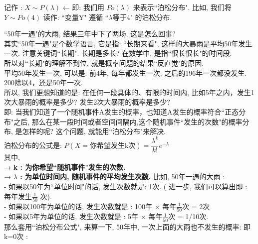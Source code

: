 \documentclass[UTF8]{ctexart}
\begin{document}
	记作 : $\boxed{	X \sim P(\lambda)}$	← 	即: 我们用 $Po(\lambda)$ 来表示``泊松分布". 比如, 我们将$ Y \sim Po(4)$ 读作: ``变量Y" 遵循 ``$\lambda$等于4" 的泊松分布. \\

	
	
	
	
	
	
	
	
	\begin{myEnvSample}
		``50年一遇"的大雨, 结果三年中下了两场, 这是怎么回事? \\
		其实``50年一遇"是个数学语言, 它是指: ``长期来看", 这样的大暴雨是平均50年发生一次. 注意关键词``长期". 长期是多长? 在数学中, 是指``很长很长"的时间段. \\
		所以对``长期"的理解不到位, 就是概率问题的结果``反直觉"的原因. \\
		
		平均50年发生一次, 可以是:  前4年, 每年都发生一次; 之后的196年一次都没发生. 200除以4，还是50年一次. \\
		
		所以, 我们更想知道的是: 在任何一段具体的、有限的时间内, 比如5年之内，发生1次大暴雨的概率是多少? 发生2次大暴雨的概率是多少? \\
		
		即: 当我们知道了一个随机事件A发生的概率，也知道A发生的概率符合``正态分布"之后, 那么在某一段时间或者空间间隔内,这个随机事件``发生的次数"的概率分布, 是怎样的呢? 这个问题, 就能用``泊松分布"来解决. \\
		
		泊松分布的公式是: 	$ \boxed{
		P(X=\text{你希望发生k次})=\dfrac{\lambda^k} {k!} e^{-\lambda}}$	 \\
		其中, \\
		→ \textbf{k : 为你希望``随机事件"发生的次数.} \\
		→ \textbf{$\lambda$ : 为单位时间内, 随机事件的平均发生次数.} 比如, 50年一遇的大雨 : \\
		- 如果以50年为``单位时间"的话, 发生次数就是: 1次.  ( 进一步, 我们可以算出即 : 每年发生$\frac{1} {50}$ 次).  \\
		- 如果以100年为单位的话, 发生次数就是 : 100年 ×  每年$\frac{1} {50}$次 = 2次  \\
		- 如果以5年为单位的话, 发生次数就是 :  5年 ×  每年$\frac{1} {50}$次 = 1/10次. \\ 
		
		那么套用``泊松分布公式", 来算一下, 50年中, 一次上面的大雨也不发生的概率: 即 k=0次 : \\
		

\end{myEnvSample}
\end{document}
